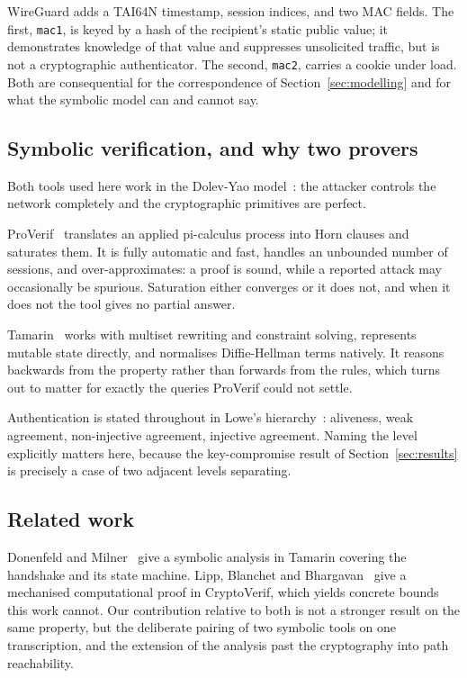  WireGuard adds a TAI64N timestamp, session
indices, and two MAC fields. The first, \texttt{mac1}, is keyed by a hash of
the recipient's static public value; it demonstrates knowledge of that value
and suppresses unsolicited traffic, but is not a cryptographic authenticator.
The second, \texttt{mac2}, carries a cookie under load. Both are
consequential for the correspondence of Section~\ref{sec:modelling} and for
what the symbolic model can and cannot say.

\subsection{Symbolic verification, and why two provers}

Both tools used here work in the Dolev-Yao model~\cite{dolev1983security}: the
attacker controls the network completely and the cryptographic primitives are
perfect.

 ProVerif~\cite{blanchet2016proverif} translates an applied
pi-calculus process into Horn clauses and saturates them. It is fully
automatic and fast, handles an unbounded number of sessions, and
over-approximates: a proof is sound, while a reported attack may occasionally
be spurious. Saturation either converges or it does not, and when it does not
the tool gives no partial answer.

 Tamarin~\cite{meier2013tamarin} works with multiset rewriting
and constraint solving, represents mutable state directly, and normalises
Diffie-Hellman terms natively. It reasons backwards from the property rather
than forwards from the rules, which turns out to matter for exactly the
queries ProVerif could not settle.

 Authentication is stated throughout
in Lowe's hierarchy~\cite{lowe1997hierarchy}: aliveness, weak agreement,
non-injective agreement, injective agreement. Naming the level explicitly
matters here, because the key-compromise result of
Section~\ref{sec:results} is precisely a case of two adjacent levels
separating.

\subsection{Related work}

 Donenfeld and
Milner~\cite{donenfeld2018formal} give a symbolic analysis in Tamarin covering
the handshake and its state machine. Lipp, Blanchet and
Bhargavan~\cite{lipp2019cryptoverif} give a mechanised computational proof in
CryptoVerif, which yields concrete bounds this work cannot. Our contribution
relative to both is not a stronger result on the same property, but the
deliberate pairing of two symbolic tools on one transcription, and the
extension of the analysis past the cryptography into path reachability.

